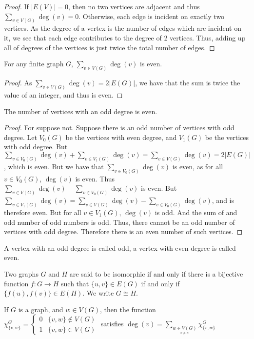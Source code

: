\documentclass[crop=false,class=book,oneside]{standalone}
\begin{document}
\begin{proof}
If $|E(V)| = 0$, then no two vertices are adjacent and thus $\sum_{v\in V(G)}\deg(v) = 0$. Otherwise, each edge is incident on exactly two vertices. As the degree of a vertex is the number of edges which are incident on it, we see that each edge contributes to the degree of 2 vertices. Thus, adding up all of degrees of the vertices is just twice the total number of edges.
\end{proof}
\begin{corollary}
For any finite graph $G$, $\sum_{v\in V(G)}\deg(v)$ is even.
\end{corollary}
\begin{proof} As $\sum_{v\in V(G)}\deg(v) = 2|E(G)|$, we have that the sum is twice the value of an integer, and thus is even.
\end{proof}
\begin{corollary}
The number of vertices with an odd degree is even.
\end{corollary}
\begin{proof}
For suppose not. Suppose there is an odd number of vertices with odd degree. Let $V_0(G)$ be the vertices with even degree, and $V_1(G)$ be the vertices with odd degree. But $\sum_{v\in V_0(G)}\deg(v) + \sum_{v\in V_1(G)} \deg(v) = \sum_{v\in V(G)}\deg(v) = 2|E(G)|$, which is even. But we have that $\sum_{v\in V_0(G)}\deg(v)$ is even, as for all $v\in V_{0}(G)$, $\deg(v)$ is even. Thus $\sum_{v\in V(G)}\deg(v) - \sum_{v\in V_0(G)}\deg(v)$ is even. But $\sum_{v\in V_1(G)}\deg(v) = \sum_{v\in V(G)}\deg(v) - \sum_{v\in V_0(G)}\deg(v)$, and is therefore even. But for all $v\in V_1(G)$, $\deg(v)$ is odd. And the sum of and odd number of odd numbers is odd. Thus, there cannot be an odd number of vertices with odd degree. Therefore there is an even number of such vertices.
\end{proof}
\begin{definition}
A vertex with an odd degree is called odd, a vertex with even degree is called even.
\end{definition}
\begin{definition}
Two graphs $G$ and $H$ are said to be isomorphic if and only if there is a bijective function $f:G\rightarrow H$ such that $\{u,v\}\in E(G)$ if and only if $\{f(u),f(v)\}\in E(H)$. We write $G \cong H$.
\end{definition}
\begin{lemma}
If $G$ is a graph, and $w\in V(G)$, then the function $\chi_{\{v,w\}}^G = \begin{cases} 0 & \{v,w\} \notin V(G) \\ 1 & \{v,w\} \in V(G) \end{cases}$ satisfies $\deg(v) = \sum_{\underset{v\ne w}{w\in V(G)}} \chi_{\{v,w\}}^G$
\end{lemma}
\end{document}
